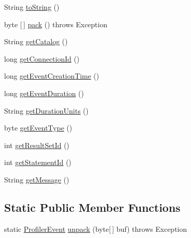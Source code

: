 \begin{DoxyCompactItemize}
\item 
String \mbox{\hyperlink{classcom_1_1mysql_1_1jdbc_1_1profiler_1_1_profiler_event_a492ffcc14034b9eaae70948322566592}{to\+String}} ()
\item 
byte \mbox{[}$\,$\mbox{]} \mbox{\hyperlink{classcom_1_1mysql_1_1jdbc_1_1profiler_1_1_profiler_event_aca4cafacdd420d38a2fbf0213d3e7a43}{pack}} ()  throws Exception 
\item 
String \mbox{\hyperlink{classcom_1_1mysql_1_1jdbc_1_1profiler_1_1_profiler_event_aaee50466557164f5808399334b80754a}{get\+Catalog}} ()
\item 
long \mbox{\hyperlink{classcom_1_1mysql_1_1jdbc_1_1profiler_1_1_profiler_event_a72cc33be979416c497f5aa95148a9b58}{get\+Connection\+Id}} ()
\item 
long \mbox{\hyperlink{classcom_1_1mysql_1_1jdbc_1_1profiler_1_1_profiler_event_a642d75df4aef2a2759e3b8049b77e7f7}{get\+Event\+Creation\+Time}} ()
\item 
long \mbox{\hyperlink{classcom_1_1mysql_1_1jdbc_1_1profiler_1_1_profiler_event_ac84aed0bf6e19ad0e018fe0f1ebc00c6}{get\+Event\+Duration}} ()
\item 
String \mbox{\hyperlink{classcom_1_1mysql_1_1jdbc_1_1profiler_1_1_profiler_event_aecf3c0f13945accbbbe6ba77eb5189ca}{get\+Duration\+Units}} ()
\item 
byte \mbox{\hyperlink{classcom_1_1mysql_1_1jdbc_1_1profiler_1_1_profiler_event_a4f980f077874e2c02ef0b871166c0f40}{get\+Event\+Type}} ()
\item 
int \mbox{\hyperlink{classcom_1_1mysql_1_1jdbc_1_1profiler_1_1_profiler_event_ab2278ad9e42c2abcb5f723cb0fe79acc}{get\+Result\+Set\+Id}} ()
\item 
int \mbox{\hyperlink{classcom_1_1mysql_1_1jdbc_1_1profiler_1_1_profiler_event_aa4b1dcf9ac3ed0e242820a1c7f582521}{get\+Statement\+Id}} ()
\item 
String \mbox{\hyperlink{classcom_1_1mysql_1_1jdbc_1_1profiler_1_1_profiler_event_a67c7d65e3ace6062a69cdab99f466b3c}{get\+Message}} ()
\end{DoxyCompactItemize}
\subsection*{Static Public Member Functions}
\begin{DoxyCompactItemize}
\item 
static \mbox{\hyperlink{classcom_1_1mysql_1_1jdbc_1_1profiler_1_1_profiler_event}{Profiler\+Event}} \mbox{\hyperlink{classcom_1_1mysql_1_1jdbc_1_1profiler_1_1_profiler_event_ae4fb6b9cacc1749a77df0c3eec048a8e}{unpack}} (byte\mbox{[}$\,$\mbox{]} buf)  throws Exception 
\end{DoxyCompactItemize}

